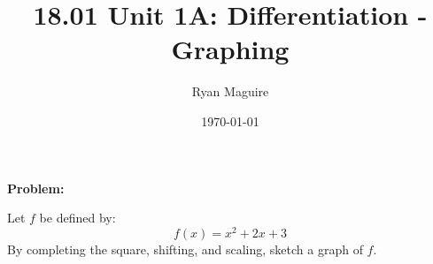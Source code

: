\documentclass{article}
\title{18.01 Unit 1A: Differentiation - Graphing}
\author{Ryan Maguire}
\date{\today}
\newif\ifsolution
\begin{document}
    \maketitle
    \textbf{Problem:}
    \par\hfill\par
    Let $f$ be defined by:
    \[
        f(x)=x^{2}+2x+3
    \]
    By completing the square, shifting, and scaling, sketch a graph of
    $f$.
    \par\hfill\par
    \ifsolution
        \color{blue}
        \textbf{Solution:}
        \par\hfill\par
        The quadratic has no real roots. This can be verified using a bit
        of calculus. Application of the derivative shows us the smallest this
        function gets occurs at $x=-1$, and $f(-1)=2$. So we can't factor it
        with real numbers, but we can complete the square. We have:
        \[
            x^{2}+2x=(x+1)^{2}-1
        \]
        And hence:
        \[
            f(x)=x^{2}+2x+3=(x+1)^{2}+2
        \]
        We know what the graph of $y=x^{2}$ looks like, it is an ordinary
        parabola. This final formula tells us we are shifting this familiar
        image vertically \textit{upwards} by 2 and horizontally to the
        \textit{left} by 1. This creates the image below.
        \begin{figure}
            \centering
            \texttt{[image: completing\_the\_square\_and\_graphing\_002]}
            \caption{Graph of $f$}
        \end{figure}
    \fi
\end{document}
